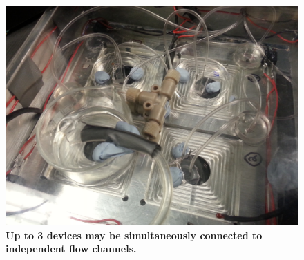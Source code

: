         \begin{figure}[!h]
            \centering
            \includegraphics[width=15cm]{chapter2/figures/flow/3Devices.jpg}
            \caption[Image of 3 coverslip devices under flow simultaneously]{\textbf{Up to 3 devices may be simultaneously connected to independent flow channels.}}
            \label{fig:app:3Devices}

        \end{figure}

